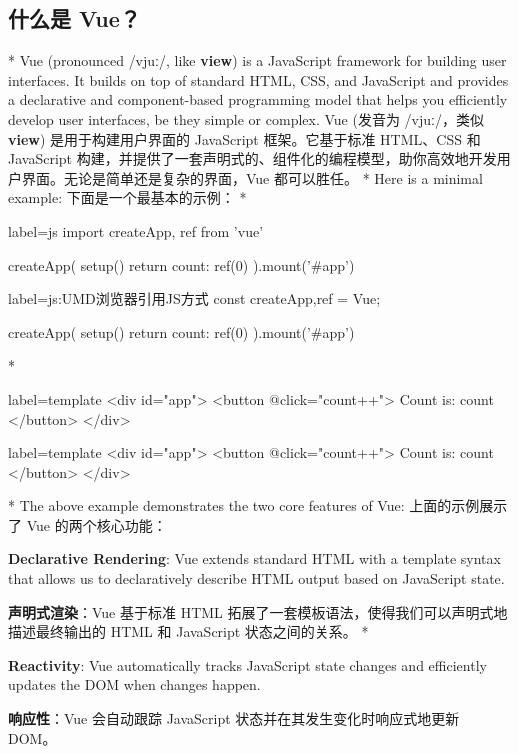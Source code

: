 \begin{paracol}{2}
\subsection{什么是 Vue？}
\switchcolumn[0]*%
Vue (pronounced {\fontGentiumPlus /vjuː/}, like \textbf{view}) is a JavaScript framework
for building user interfaces. It builds on top of standard HTML, CSS,
and JavaScript and provides a declarative and component-based
programming model that helps you efficiently develop user interfaces, be
they simple or complex.
\switchcolumn
Vue (发音为 {\fontGentiumPlus /vjuː/}，类似 \textbf{view}) 是用于构建用户界面的
JavaScript 框架。它基于标准 HTML、CSS 和 JavaScript
构建，并提供了一套声明式的、组件化的编程模型，助你高效地开发用户界面。无论是简单还是复杂的界面，Vue
都可以胜任。
\switchcolumn[0]*%
Here is a minimal example:
\switchcolumn
下面是一个最基本的示例：
\switchcolumn[0]*%
\begin{codeJs*}{label={js}}
import { createApp, ref } from 'vue'

createApp({
  setup() {
    return {
      count: ref(0)
    }
  }
}).mount('#app')
\end{codeJs*}
\switchcolumn
\begin{codeJs*}{label={js:UMD浏览器引用JS方式}}
const {createApp,ref} = Vue;

createApp({
    setup() {
    return {
        count: ref(0)
    }
    }
}).mount('#app')
\end{codeJs*}
\switchcolumn[0]*%
\begin{codeHtml*}{label={template}}
<div id="app">
    <button @click="count++">
        Count is: {{ count }}
    </button>
</div>
\end{codeHtml*}
\switchcolumn
\begin{codeHtml*}{label={template}}
<div id="app">
    <button @click="count++">
        Count is: {{ count }}
    </button>
</div>
\end{codeHtml*}
\switchcolumn[0]*%
The above example demonstrates the two core features of Vue:
\switchcolumn
上面的示例展示了 Vue 的两个核心功能：
\end{paracol}

\begin{itemize}
\begin{paracol}{2}
\item
\textbf{Declarative Rendering}: Vue extends standard HTML with a
template syntax that allows us to declaratively describe HTML output
based on JavaScript state.
\switchcolumn
\item
\textbf{声明式渲染}：Vue 基于标准 HTML
拓展了一套模板语法，使得我们可以声明式地描述最终输出的 HTML 和
JavaScript 状态之间的关系。
\switchcolumn[0]*%
\item
\textbf{Reactivity}: Vue automatically tracks JavaScript state changes
and efficiently updates the DOM when changes happen.
\switchcolumn
\item
\textbf{响应性}：Vue 会自动跟踪 JavaScript
状态并在其发生变化时响应式地更新 DOM。
\end{paracol}
\end{itemize}


